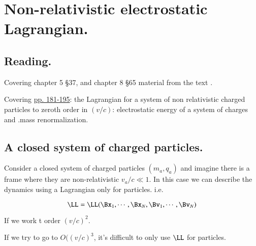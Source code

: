 %
%

\chapter{Non-relativistic electrostatic Lagrangian.}
\label{chap:relativisticElectrodynamicsL24}
{}
\date{Mar 30, 2011}

\beginArtNoToc

\section{Reading.}

Covering chapter 5 \S 37, and chapter 8 \S 65 material from the text \citep{landau1980classical}.

Covering \href{http://www.physics.utoronto.ca/~poppitz/epoppitz/PHY450_files/RelEMpp181-195.pdf}{pp. 181-195}: the Lagrangian for a system of non relativistic charged particles to zeroth order in $(v/c)$: electrostatic energy of a system of charges and .mass renormalization.

\section{A closed system of charged particles.}

Consider a closed system of charged particles $(m_a, q_a)$ and imagine there is a frame where they are non-relativistic $v_a/c \ll 1$.  In this case we can describe the dynamics using a Lagrangian only for particles.  i.e.

\begin{equation}\label{eqn:relativisticElectrodynamicsL24:50}
\LL = \LL( \Bx_1, \cdots, \Bx_N, \Bv_1, \cdots, \Bv_N)
\end{equation}

If we work t order $(v/c)^2$.

If we try to go to $O((v/c)^3$, it's difficult to only use $\LL$ for particles.


